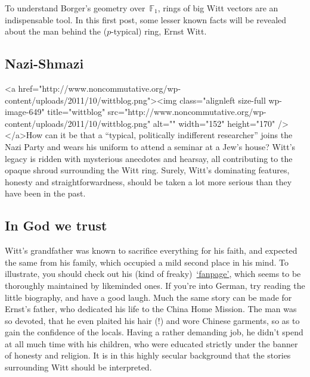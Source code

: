 To understand Borger's geometry over~${\mathbb{F}_{1}}$, rings of big Witt vectors are an indispensable tool. In this first post, some lesser known facts will be revealed about the man behind the ($p$-typical) ring, Ernst Witt.

\subsection{Nazi-Shmazi}
<a href="http://www.noncommutative.org/wp-content/uploads/2011/10/wittblog.png"><img class="alignleft size-full wp-image-649" title="wittblog" src="http://www.noncommutative.org/wp-content/uploads/2011/10/wittblog.png" alt="" width="152" height="170" /></a>How can it be that a ``typical, politically indifferent researcher'' joins the Nazi Party and wears his uniform to attend a seminar at a Jew's house? Witt's legacy is ridden with mysterious anecdotes and hearsay, all contributing to the opaque shroud surrounding the Witt ring. Surely, Witt's dominating features, honesty and straightforwardness, should be taken a lot more serious than they have been in the past.

\subsection{In God we trust}
Witt's grandfather was known to sacrifice everything for his faith, and expected the same from his family, which occupied a mild second place in his mind. To illustrate, you should check out his (kind of freaky) \href{http://www.norddeutsche-lehrer-gemeinschaft.de/heinrich-witt.html}{`fanpage'}, which seems to be thoroughly maintained by likeminded ones. If you're into German, try reading the little biography, and have a good laugh. Much the same story can be made for Ernst's father, who dedicated his life to the China Home Mission. The man was so devoted, that he even plaited his hair (!) and wore Chinese garments, so as to gain the confidence of the locals. Having a rather demanding job, he didn't spend at all much time with his children, who were educated strictly under the banner of honesty and religion. It is in this highly secular background that the stories surrounding Witt should be interpreted.

